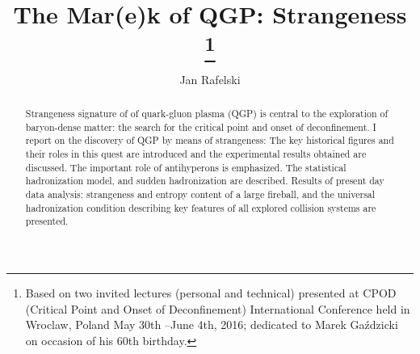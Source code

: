 \documentclass{appolb}
\begin{document}
\textwidth=135mm
\textheight=200mm
\title{The Mar(e)k of QGP: Strangeness%
\thanks{Based on two invited lectures (personal and technical) presented at CPOD (Critical Point and Onset of Deconfinement) International Conference held in Wroclaw, Poland May 30th --June 4th, 2016; dedicated to Marek Ga\'zdzicki on occasion of his 60th birthday.}
}
\author{Jan Rafelski
\address{Department of Physics, The University of Arizona\\ Tucson, AZ 85721, USA}
}
\maketitle


\begin{abstract} 
Strangeness signature of of quark-gluon plasma (QGP) is central to the exploration of baryon-dense matter: the search for the critical point and onset of deconfinement.  I report on the discovery of QGP by means of strangeness: The key historical figures and their roles in this quest are introduced and the experimental results obtained are discussed. The important role of antihyperons is emphasized. The statistical hadronization model, and  sudden hadronization are described. Results of present day data analysis:  strangeness and entropy content of a large fireball, and the universal hadronization condition describing key features of all explored collision systems are presented.
\end{abstract}


\end{document}
